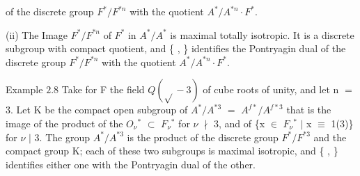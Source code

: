 \documentclass[10pt,a4paper]{article}
\begin{document}
\clearpage
{}
\label{d035-physical-015}
\par of the discrete group $F^*/F^{*n}$ with the quotient $A^*/A^{*n}\cdot{}F^*$.\par
\par (ii) The Image $F^*/F^{*n}$ of $F^*$ in $A^*/A^*$ is maximal totally isotropic. It is a discrete subgroup with compact quotient, and \{ , \} identifies the Pontryagin dual of the discrete group $F^*/F^{*n}$ with the quotient $A^*/A^{*n}\cdot{}F^*$.\par
\par Example $2.8$ Take for F the field $Q(\sqrt{}-3)$ of cube roots of unity, and let n $=$ 3. Let K be the compact open subgroup of $A^*/A^{*3}$ $=$ $A^{f*}/A^{f*3}$ that is the image of the product of the $O_\nu{}^*$ $\subset{}$ $F_\nu{}^*$ for $\nu{}$ $\nmid{}$ 3, and of \{x $\in{}$ $F_\nu{}^*$ $|$ x $\equiv{}$ 1(3)\} for $\nu{}$ $|$ 3. The group $A^*/A^{*3}$ is the product of the discrete group $F^*/F^{*3}$ and the compact group K; each of these two subgroups is maximal isotropic, and \{ , \} identifies either one with the Pontryagin dual of the other.\par
\end{document}
